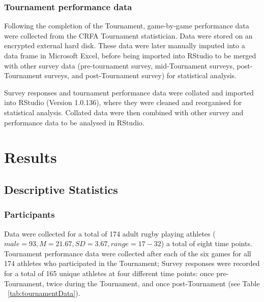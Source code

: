 \subsubsection{Tournament performance data}
Following the completion of the Tournament, game-by-game performance data were collected from the CRFA Tournament statistician. Data were stored on an encrypted external hard disk. These data were later manually imputed into a data frame in Microsoft Excel, before being imported into RStudio to be merged with other survey data (pre-tournament survey, mid-Tournament surveys, post-Tournament surveys, and post-Tournament survey) for statistical analysis.

Survey responses and tournament performance data were collated and imported into RStudio (Version 1.0.136), where they were cleaned and reorganised for statistical analysis. Collated data were then combined with other survey and performance data to be analysed in RStudio.

















\section{Results}



\subsection{Descriptive Statistics}

  \subsubsection{Participants}

Data were collected for a total of 174 adult rugby playing athletes ($male = 93, M = 21.67, SD = 3.67, range = 17-32$) a total of eight time points. Tournament performance data were collected after each of the six games for all 174 athletes who participated in the Tournament;  Survey responses were recorded for a total of 165 unique athletes at four different time points: once pre-Tournament, twice during the Tournament, and once post-Tournament (see Table ~\ref{tab:tournamentData}).


